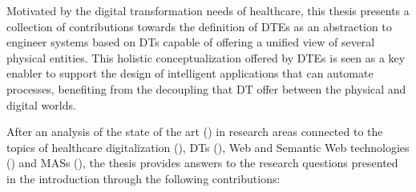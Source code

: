 Motivated by the digital transformation needs of healthcare, 
this thesis presents a collection of contributions towards the definition of \acp{DTE} as an abstraction to engineer systems based on \acp{DT} capable of offering a unified view of several physical entities. 
%
This holistic conceptualization offered by \acp{DTE} is seen as a key enabler to support the design of intelligent applications that can automate processes, benefiting from the decoupling that \ac{DT} offer between the physical and digital worlds.

After an analysis of the state of the art () in research areas connected to the topics of healthcare digitalization (), \aclp{DT} (), Web and Semantic Web technologies () and \acp{MAS} (),
the thesis provides answers to the research questions presented in the introduction through the following contributions:

